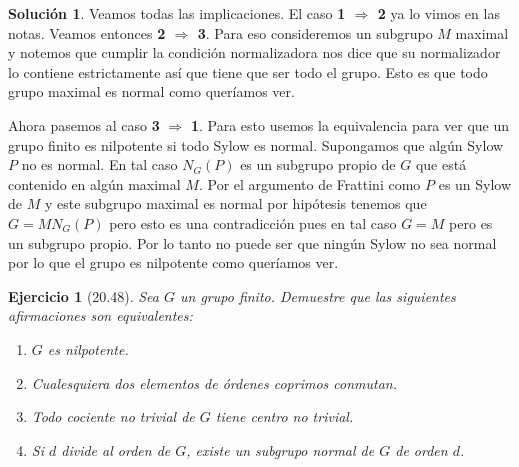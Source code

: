 \documentclass[11pt]{article}
\theoremstyle{plain}
\newtheorem*{ej}{Ejercicio}
\theoremstyle{definition}
\newtheorem*{sol}{Solución}
\theoremstyle{remark}
\begin{document}
\begin{sol}
	Veamos todas las implicaciones. El caso \textbf{1 $\Rightarrow$ 2} ya lo vimos en las notas. Veamos entonces \textbf{2 $\Rightarrow$ 3}. Para eso consideremos un subgrupo $M$ maximal y notemos que cumplir la condición normalizadora nos dice que su normalizador lo contiene estrictamente así que tiene que ser todo el grupo. Esto es que todo grupo maximal es normal como queríamos ver.
	
	Ahora pasemos al caso \textbf{3} $\Rightarrow$ \textbf{1}. Para esto usemos la equivalencia para ver que un grupo finito es nilpotente si todo Sylow es normal. Supongamos que algún Sylow $P$ no es normal. En tal caso $N_G(P)$ es un subgrupo propio de $G$ que está contenido en algún maximal $M$. Por el argumento de Frattini como $P$ es un Sylow de $M$ y este subgrupo maximal es normal por hipótesis tenemos que $G=MN_G(P)$ pero esto es una contradicción pues en tal caso $G = M$ pero es un subgrupo propio. Por lo tanto no puede ser que ningún Sylow no sea normal por lo que el grupo es nilpotente como queríamos ver.
\end{sol}
\newpage

\begin{tcolorbox}[colback=teal!25!white,colframe=teal!75!black]
	\begin{ej}[20.48] Sea $G$ un grupo finito. Demuestre que las siguientes afirmaciones son equivalentes: 
		\begin{enumerate}
			\item $G$ es nilpotente.
			\item Cualesquiera dos elementos de órdenes coprimos conmutan.
			\item Todo cociente no trivial de $G$ tiene centro no trivial.
			\item Si $d$ divide al orden de $G$, existe un subgrupo normal de $G$ de orden $d$.
		\end{enumerate}
	\end{ej}	
\end{tcolorbox}
\medskip
\end{document}
